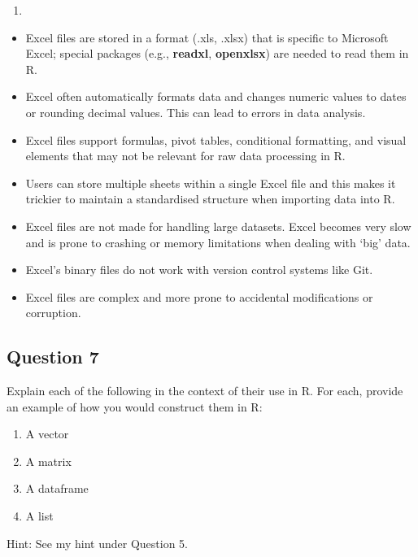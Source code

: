 \documentclass[
  10t,
]{article}
\providecommand{\tightlist}{%
  \setlength{\itemsep}{0pt}\setlength{\parskip}{0pt}}\usepackage{longtable,booktabs,array}
\begin{document}
\begin{enumerate}
\def\labelenumi{\alph{enumi})}
\setcounter{enumi}{2}
\tightlist
\item
\end{enumerate}

\begin{itemize}
\tightlist
\item
  Excel files are stored in a format (.xls, .xlsx) that is specific to
  Microsoft Excel; special packages (e.g., \textbf{readxl},
  \textbf{openxlsx}) are needed to read them in R.
\item
  Excel often automatically formats data and changes numeric values to
  dates or rounding decimal values. This can lead to errors in data
  analysis.
\item
  Excel files support formulas, pivot tables, conditional formatting,
  and visual elements that may not be relevant for raw data processing
  in R.
\item
  Users can store multiple sheets within a single Excel file and this
  makes it trickier to maintain a standardised structure when importing
  data into R.
\item
  Excel files are not made for handling large datasets. Excel becomes
  very slow and is prone to crashing or memory limitations when dealing
  with `big' data.
\item
  Excel's binary files do not work with version control systems like
  Git.
\item
  Excel files are complex and more prone to accidental modifications or
  corruption.
\end{itemize}

\subsection{Question 7}\label{question-7}

Explain each of the following in the context of their use in R. For
each, provide an example of how you would construct them in R:

\begin{enumerate}
\def\labelenumi{\alph{enumi}.}
\tightlist
\item
  A vector
\item
  A matrix
\item
  A dataframe
\item
  A list
\end{enumerate}

Hint: See my hint under Question 5.
\end{document}
